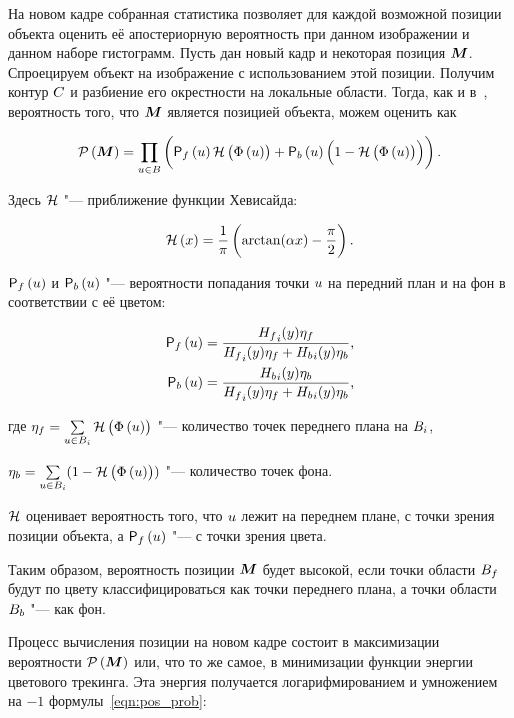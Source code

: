 На новом кадре собранная статистика позволяет для каждой возможной позиции
объекта оценить её апостериорную вероятность при данном изображении и данном
наборе гистограмм.
Пусть дан новый кадр и некоторая позиция $\bm{M}$.
Спроецируем объект на изображение с использованием этой позиции.
Получим контур $C$ и разбиение его окрестности на локальные области.
Тогда, как и в~\cite{Hexner2016}, вероятность того, что $\bm{M}$ является
позицией объекта, можем оценить как

\begin{equation}
\label{eqn:pos_prob}
    \mathcal{P} \left( \bm{M} \right)  = \prod\limits_{\mathnormal{u} \in B} \left(
        \mathsf{P}_f \left( \mathnormal{u} \right) \mathcal{H} \left( \Phi \left( \mathnormal{u} \right) \right)
        + \mathsf{P}_b \left( \mathnormal{u} \right) \left( 1 - \mathcal{H} \left( \Phi \left( \mathnormal{u} \right) \right) \right)
    \right)
\text{.}
\end{equation}

Здесь $\mathcal{H}$ "--- приближение функции Хевисайда:

\begin{equation}
\label{eqn:heaviside}
    \mathcal{H} \left( x \right) = \frac{1}{\pi} \left( \arctan(\alpha x) - \frac{\pi}{2} \right)
\text{.}
\end{equation}

$\mathsf{P}_f \left( \mathnormal{u} \right)$ и $\mathsf{P}_b \left( \mathnormal{u} \right)$ "--- вероятности попадания точки $\mathnormal{u}$ на
передний план и на фон в соответствии с её цветом:

\begin{align}
\label{eqn:Pfu}
    \mathsf{P}_f \left( \mathnormal{u} \right) &= \frac{{H_f}_i(y)\eta_f}{{H_f}_i(y)\eta_f +
        {H_b}_i(y)\eta_b} \text{,} \\
    \mathsf{P}_b \left( \mathnormal{u} \right) &=\frac{{H_b}_i(y)\eta_b}{{H_f}_i(y)\eta_f +
        {H_b}_i(y)\eta_b} \text{,}
\end{align}

где
$
    \eta_f = \sum\limits_{\mathnormal{u} \in B_i}\mathcal{H} \left( \Phi \left( \mathnormal{u} \right) \right)
$ "--- количество точек переднего плана на $B_i$,

$
    \eta_b = \sum\limits_{\mathnormal{u} \in B_i}(1 - \mathcal{H} \left( \Phi \left( \mathnormal{u} \right) \right))
$ "--- количество точек фона.

$\mathcal{H}$ оценивает вероятность того, что $\mathnormal{u}$ лежит на переднем плане, с точки
зрения позиции объекта, а $\mathsf{P}_f \left( \mathnormal{u} \right)$ "--- с точки зрения цвета.

Таким образом, вероятность позиции $\bm{M}$ будет высокой, если точки области
$B_f$ будут по цвету классифицироваться как точки переднего плана, а
точки области $B_b$ "--- как фон.

Процесс вычисления позиции на новом кадре состоит в максимизации вероятности
$\mathcal{P} \left( \bm{M} \right) $ или, что то же самое, в минимизации функции энергии
цветового трекинга.
Эта энергия получается логарифмированием и умножением на $-1$
формулы~\ref{eqn:pos_prob}:

